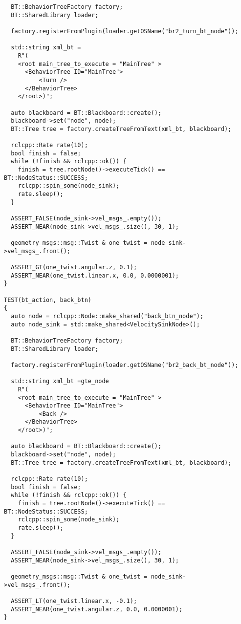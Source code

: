 \begin{tcolorbox}[sharp corners, colframe=gray!80, colback=LightGray, left=0pt, top=0pt, bottom=0pt, title=\texttt{br2\_bt\_bumpgo/tests/bt\_action\_test.cpp}]
\begin{verbatim}
  BT::BehaviorTreeFactory factory;
  BT::SharedLibrary loader;

  factory.registerFromPlugin(loader.getOSName("br2_turn_bt_node"));

  std::string xml_bt =
    R"(
    <root main_tree_to_execute = "MainTree" >
      <BehaviorTree ID="MainTree">
          <Turn />
      </BehaviorTree>
    </root>)";

  auto blackboard = BT::Blackboard::create();
  blackboard->set("node", node);
  BT::Tree tree = factory.createTreeFromText(xml_bt, blackboard);

  rclcpp::Rate rate(10);
  bool finish = false;
  while (!finish && rclcpp::ok()) {
    finish = tree.rootNode()->executeTick() == BT::NodeStatus::SUCCESS;
    rclcpp::spin_some(node_sink);
    rate.sleep();
  }

  ASSERT_FALSE(node_sink->vel_msgs_.empty());
  ASSERT_NEAR(node_sink->vel_msgs_.size(), 30, 1);

  geometry_msgs::msg::Twist & one_twist = node_sink->vel_msgs_.front();

  ASSERT_GT(one_twist.angular.z, 0.1);
  ASSERT_NEAR(one_twist.linear.x, 0.0, 0.0000001);
}

TEST(bt_action, back_btn)
{
  auto node = rclcpp::Node::make_shared("back_btn_node");
  auto node_sink = std::make_shared<VelocitySinkNode>();

  BT::BehaviorTreeFactory factory;
  BT::SharedLibrary loader;

  factory.registerFromPlugin(loader.getOSName("br2_back_bt_node"));

  std::string xml_bt =gte_node
    R"(
    <root main_tree_to_execute = "MainTree" >
      <BehaviorTree ID="MainTree">
          <Back />
      </BehaviorTree>
    </root>)";

  auto blackboard = BT::Blackboard::create();
  blackboard->set("node", node);
  BT::Tree tree = factory.createTreeFromText(xml_bt, blackboard);

  rclcpp::Rate rate(10);
  bool finish = false;
  while (!finish && rclcpp::ok()) {
    finish = tree.rootNode()->executeTick() == BT::NodeStatus::SUCCESS;
    rclcpp::spin_some(node_sink);
    rate.sleep();
  }

  ASSERT_FALSE(node_sink->vel_msgs_.empty());
  ASSERT_NEAR(node_sink->vel_msgs_.size(), 30, 1);

  geometry_msgs::msg::Twist & one_twist = node_sink->vel_msgs_.front();

  ASSERT_LT(one_twist.linear.x, -0.1);
  ASSERT_NEAR(one_twist.angular.z, 0.0, 0.0000001);
}


\end{verbatim}
\end{tcolorbox}

